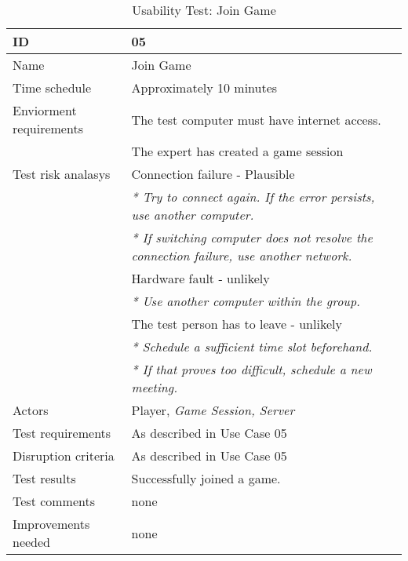 {\footnotesize
\begin{table}[H]
\begin{tabular}{| p{5cm} | p{10cm} |}\hline
	\textbf{ID}	& \textbf{05} \\ \hline
	Name		& Join Game\\ \hline
	Time schedule	& Approximately 10 minutes\\ \hline
	Enviorment requirements 
		& The test computer must have internet access. \\ 
		& The expert has created a game session\\ \hline
	Test risk analasys 
		& Connection failure - Plausible \\
		& \emph{* Try to connect again. If the error persists, use another computer.} \\
		& \emph{* If switching computer does not resolve the connection failure, use another network.}\\
		& Hardware fault - unlikely \\
		& \emph{* Use another computer within the group.} \\
		& The test person has to leave - unlikely \\
		& \emph{* Schedule a sufficient time slot beforehand.} \\
		& \emph{* If that proves too difficult, schedule a new meeting.}\\ \hline
	Actors	& Player, \emph{Game Session, Server}\\ \hline
	Test requirements & As described in Use Case 05 \\ \hline
	Disruption criteria & As described in Use Case 05  \\ \hline
	Test results & Successfully joined a game.
		& \\ \hline
	Test comments & none
		& \\ \hline
	Improvements needed & none
		& \\ \hline
\end{tabular}


\caption{Usability Test: Join Game}
\label{fig:usability_test_5}
\end{table}}



